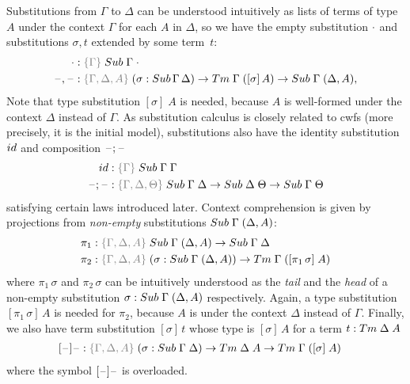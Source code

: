 \documentclass[a4paper,UKenglish,numberwithinsect,cleveref,thm-restate]{lipics-v2021}
\begin{document}
Substitutions from $\Gamma$ to $\Delta$ can be understood intuitively as lists of terms of type $A$ under the context $\Gamma$ for each $A$ in $\Delta$, so we have the empty substitution $\cdot$ and substitutions $\sigma, t$ extended by some term~$t$:
\begin{alignat*}{3}
  \emptysub & : \implicit{\Gamma}\;\Sub\;\Gamma\;\emptyctx \\
  \blank,\blank & : \implicit{\Gamma, \Delta, A}\;(\sigma : \Sub\,\Gamma\,\Delta) \to \Tm\;\Gamma\;([ \sigma ]\, A) \to \Sub\;\Gamma\;(\Delta, A),
\end{alignat*}
Note that type substitution $[\sigma]\;A$ is needed, because $A$ is well-formed under the context $\Delta$ instead of $\Gamma$.
As substitution calculus is closely related to cwfs (more precisely, it is the initial model), substitutions also have the identity substitution $\idS$ and composition $\mathord{\hspace{1pt}\text{--}\hspace{1pt}};\mathord{\hspace{1pt}\text{--}\hspace{1pt}}$
\begin{alignat*}{3}
  \idS & : \implicit{\Gamma}\;\Sub\;\Gamma\;\Gamma \\
  \blank;\blank & : \implicit{\Gamma, \Delta, \Theta}\;\Sub\;\Gamma\;\Delta \to \Sub\;\Delta\;\Theta \to \Sub\;\Gamma\;\Theta \\
\end{alignat*}
satisfying certain laws introduced later.
Context comprehension is given by projections from \emph{non-empty} substitutions $\Sub\;\Gamma\;(\Delta, A)$:
\begin{alignat*}{3}
  \pi_1 & : \implicit{\Gamma, \Delta, A}\;\Sub\;\Gamma\;(\Delta, A) \to \Sub\;\Gamma\;\Delta \\
  \pi_2 & : \implicit{\Gamma, \Delta, A}\;(\sigma : \Sub\;\Gamma\;(\Delta, A)) \to \Tm\;\Gamma\;([ \pi_1\,\sigma ]\; A)
\end{alignat*}
where $\pi_1\,\sigma$ and $\pi_2\,\sigma$ can be intuitively understood as the \emph{tail} and the \emph{head} of a non-empty substitution $\sigma : \Sub\;\Gamma\;(\Delta, A)$ respectively.
Again, a type substitution $[\pi_1\,\sigma]\,A$ is needed for $\pi_2$, because $A$ is under the context $\Delta$ instead of $\Gamma$.
Finally, we also have term substitution $[\sigma]\,t$ whose type is $[\sigma]\,A$ for a term $t : \Tm\;\Delta\;A$
\begin{alignat*}{3}
  [\blank] \blank & : \implicit{\Gamma,\Delta, A}\;(\sigma : \Sub\;\Gamma\;\Delta) \to \Tm\;\Delta\;A \to \Tm\;\Gamma\;([\sigma]\; A)
\end{alignat*}
where the symbol $[\mathord{\hspace{1pt}\text{--}\hspace{1pt}}]\mathord{\hspace{1pt}\text{--}\hspace{1pt}}$ is overloaded.
\end{document}
